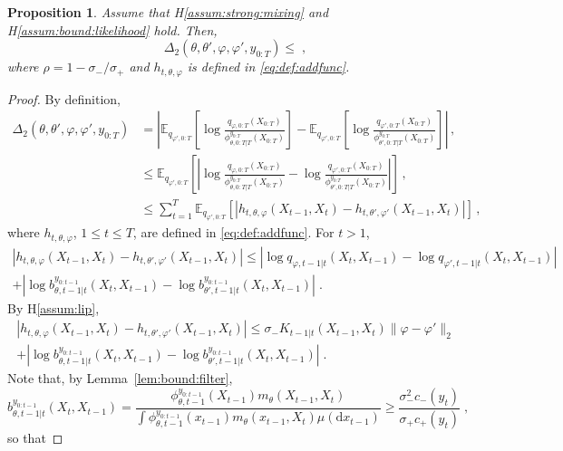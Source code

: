 \documentclass{article}
\newtheorem{proposition}[theorem]{Proposition}
\newcommand{\udlow}{\sigma_-}
\newcommand{\udup}{\sigma_+}
\newcommand{\1}{\mathbbm{1}}
\newcommand{\rmd}{\ensuremath{\mathrm{d}}}
\newcommand{\eqsp}{\;}
\begin{document}
\begin{proposition}
Assume that H\ref{assum:strong:mixing} and H\ref{assum:bound:likelihood} hold. Then,
$$
\Delta_2(\theta, \theta', \varphi, \varphi', y_{0:T}) \leq  \eqsp,
$$
where $\rho = 1-\udlow/\udup$ and $h_{t,\theta,\varphi}$ is defined in \eqref{eq:def:addfunc}.
\end{proposition}
\begin{proof}
By definition, 
\begin{align*}
\Delta_2(\theta, \theta', \varphi, \varphi', y_{0:T}) &= \left|\mathbb{E}_{q_{\varphi',0:T}}\left[\log \frac{q_{\varphi,0:T}(X_{0:T})}{\phi^{y_{0:T}}_{\theta,0:T|T}(X_{0:T})}\right] - \mathbb{E}_{q_{\varphi',0:T}}\left[\log \frac{q_{\varphi',0:T}(X_{0:T})}{\phi^{y_{0:T}}_{\theta',0:T|T}(X_{0:T})}\right]\right|\,,\\
&\leq \mathbb{E}_{q_{\varphi',0:T}}\left[\left|\log \frac{q_{\varphi,0:T}(X_{0:T})}{\phi^{y_{0:T}}_{\theta,0:T|T}(X_{0:T})} - \log \frac{q_{\varphi',0:T}(X_{0:T})}{\phi^{y_{0:T}}_{\theta',0:T|T}(X_{0:T})}\right|\right]\,,\\
&\leq \sum_{t=1}^T\mathbb{E}_{q_{\varphi',0:T}}\left[\left|h_{t,\theta,\varphi}(X_{t-1},X_t)-h_{t,\theta',\varphi'}(X_{t-1},X_t)\right|\right]\,,
\end{align*}
where $h_{t,\theta,\varphi}$, $1\leq t\leq T$,  are defined in \eqref{eq:def:addfunc}. For $t>1$,
\begin{multline*}
\left|h_{t,\theta,\varphi}(X_{t-1},X_t)-h_{t,\theta',\varphi'}(X_{t-1},X_t)\right| \leq \left|\log q_{\varphi,t-1|t}(X_t,X_{t-1}) - \log q_{\varphi',t-1|t}(X_t,X_{t-1})\right|\\
+ \left|\log b^{y_{0:t-1}}_{\theta,t-1|t}(X_t,X_{t-1})- \log b^{y_{0:t-1}}_{\theta',t-1|t}(X_t,X_{t-1})\right|\eqsp.
\end{multline*}
By H\ref{assum:lip},
\begin{multline*}
\left|h_{t,\theta,\varphi}(X_{t-1},X_t)-h_{t,\theta',\varphi'}(X_{t-1},X_t)\right| \leq \sigma_- K_{t-1|t}(X_{t-1},X_t)\|\varphi-\varphi'\|_2 \\
+ \left|\log b^{y_{0:t-1}}_{\theta,t-1|t}(X_t,X_{t-1})- \log b^{y_{0:t-1}}_{\theta',t-1|t}(X_t,X_{t-1})\right|\eqsp.
\end{multline*}
Note that, by Lemma~\ref{lem:bound:filter},
$$
b^{y_{0:t-1}}_{\theta,t-1|t}(X_t,X_{t-1}) = \frac{\phi_{\theta,t-1}^{y_{0:t-1}}(X_{t-1})m_\theta(X_{t-1},X_t)}{\int \phi_{\theta,t-1}^{y_{0:t-1}}(x_{t-1})m_\theta(x_{t-1},X_t)\mu(\rmd x_{t-1})}\geq \frac{\sigma^2_-c_-(y_t)}{\sigma_+c_+(y_t)}\eqsp,
$$
so that

\end{proof}
\end{document}
